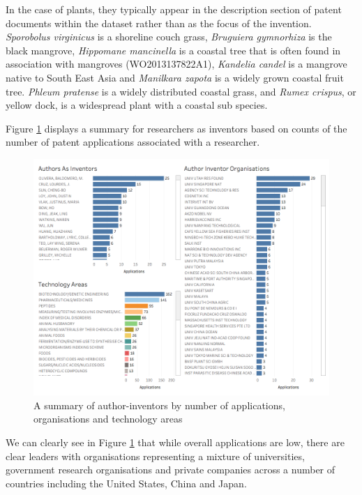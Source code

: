 \documentclass[openany]{book}
\theoremstyle{definition}
\theoremstyle{definition}
\theoremstyle{definition}
\theoremstyle{remark}
\begin{document}
In the case of plants, they typically appear in the description section
of patent documents within the dataset rather than as the focus of the
invention. \emph{Sporobolus virginicus} is a shoreline couch grass,
\emph{Bruguiera gymnorhiza} is the black mangrove, \emph{Hippomane
mancinella} is a coastal tree that is often found in association with
mangroves (WO2013137822A1), \emph{Kandelia candel} is a mangrove native
to South East Asia and \emph{Manilkara zapota} is a widely grown coastal
fruit tree. \emph{Phleum pratense} is a widely distributed coastal
grass, and \emph{Rumex crispus}, or yellow dock, is a widespread plant
with a coastal sub species.

Figure \ref{fig:authorinventordash} displays a summary for researchers
as inventors based on counts of the number of patent applications
associated with a researcher.

\begin{figure}

{\centering \includegraphics[width=1\linewidth]{images-patents/author_inventor_dashboard} 

}

\caption{A summary of author-inventors by number of applications, organisations and technology areas}\label{fig:authorinventordash}
\end{figure}

We can clearly see in Figure \ref{fig:authorinventordash} that while
overall applications are low, there are clear leaders with organisations
representing a mixture of universities, government research
organisations and private companies across a number of countries
including the United States, China and Japan.
\end{document}
